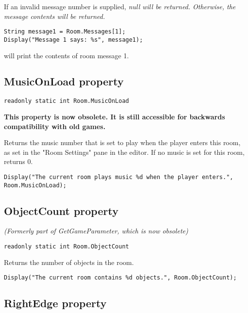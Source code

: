 If an invalid message number is supplied, \it{null} will be returned. Otherwise, the
message contents will be returned.

\begin{verbatim}
String message1 = Room.Messages[1];
Display("Message 1 says: %s", message1);
\end{verbatim}
will print the contents of room message 1.


\subsection{MusicOnLoad property}\label{Room.MusicOnLoad}%

\begin{verbatim}
readonly static int Room.MusicOnLoad
\end{verbatim}
\bf{This property is now obsolete.} It is still accessible for backwards compatibility
with old games.

Returns the music number that is set to play when the player enters this room, as
set in the "Room Settings" pane in the editor. If no music is set for this room,
returns 0.

\begin{verbatim}
Display("The current room plays music %d when the player enters.", Room.MusicOnLoad);
\end{verbatim}


\subsection{ObjectCount property}\label{Room.ObjectCount}%

\it{(Formerly part of GetGameParameter, which is now obsolete)}

\begin{verbatim}
readonly static int Room.ObjectCount
\end{verbatim}
Returns the number of objects in the room.

\begin{verbatim}
Display("The current room contains %d objects.", Room.ObjectCount);
\end{verbatim}


\subsection{RightEdge property}\label{Room.RightEdge}%

